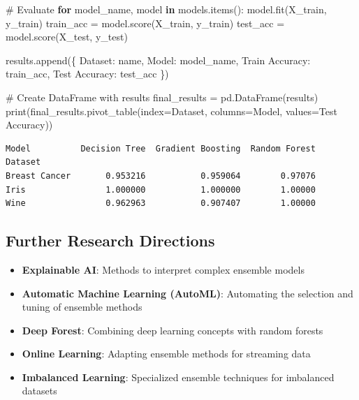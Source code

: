 \documentclass[
  letterpaper,
  DIV=11,
  numbers=noendperiod]{scrreprt}
\newenvironment{Shaded}{\begin{snugshade}}{\end{snugshade}}
\newcommand{\BuiltInTok}[1]{\textcolor[rgb]{0.00,0.23,0.31}{#1}}
\newcommand{\CommentTok}[1]{\textcolor[rgb]{0.37,0.37,0.37}{#1}}
\newcommand{\ControlFlowTok}[1]{\textcolor[rgb]{0.00,0.23,0.31}{\textbf{#1}}}
\newcommand{\KeywordTok}[1]{\textcolor[rgb]{0.00,0.23,0.31}{\textbf{#1}}}
\newcommand{\NormalTok}[1]{\textcolor[rgb]{0.00,0.23,0.31}{#1}}
\newcommand{\OperatorTok}[1]{\textcolor[rgb]{0.37,0.37,0.37}{#1}}
\newcommand{\StringTok}[1]{\textcolor[rgb]{0.13,0.47,0.30}{#1}}
\providecommand{\tightlist}{%
  \setlength{\itemsep}{0pt}\setlength{\parskip}{0pt}}\usepackage{longtable,booktabs,array}
\begin{document}
\begin{Shaded}
\begin{Highlighting}[]
    \CommentTok{\# Evaluate}
    \ControlFlowTok{for}\NormalTok{ model\_name, model }\KeywordTok{in}\NormalTok{ models.items():}
\NormalTok{        model.fit(X\_train, y\_train)}
\NormalTok{        train\_acc }\OperatorTok{=}\NormalTok{ model.score(X\_train, y\_train)}
\NormalTok{        test\_acc }\OperatorTok{=}\NormalTok{ model.score(X\_test, y\_test)}
        
\NormalTok{        results.append(\{}
            \StringTok{\textquotesingle{}Dataset\textquotesingle{}}\NormalTok{: name,}
            \StringTok{\textquotesingle{}Model\textquotesingle{}}\NormalTok{: model\_name,}
            \StringTok{\textquotesingle{}Train Accuracy\textquotesingle{}}\NormalTok{: train\_acc,}
            \StringTok{\textquotesingle{}Test Accuracy\textquotesingle{}}\NormalTok{: test\_acc}
\NormalTok{        \})}

\CommentTok{\# Create DataFrame with results}
\NormalTok{final\_results }\OperatorTok{=}\NormalTok{ pd.DataFrame(results)}
\BuiltInTok{print}\NormalTok{(final\_results.pivot\_table(index}\OperatorTok{=}\StringTok{\textquotesingle{}Dataset\textquotesingle{}}\NormalTok{, columns}\OperatorTok{=}\StringTok{\textquotesingle{}Model\textquotesingle{}}\NormalTok{, values}\OperatorTok{=}\StringTok{\textquotesingle{}Test Accuracy\textquotesingle{}}\NormalTok{))}
\end{Highlighting}
\end{Shaded}

\begin{verbatim}
Model          Decision Tree  Gradient Boosting  Random Forest
Dataset                                                       
Breast Cancer       0.953216           0.959064        0.97076
Iris                1.000000           1.000000        1.00000
Wine                0.962963           0.907407        1.00000
\end{verbatim}

\subsection{Further Research
Directions}\label{further-research-directions}

\begin{itemize}
\tightlist
\item
  \textbf{Explainable AI}: Methods to interpret complex ensemble models
\item
  \textbf{Automatic Machine Learning (AutoML)}: Automating the selection
  and tuning of ensemble methods
\item
  \textbf{Deep Forest}: Combining deep learning concepts with random
  forests
\item
  \textbf{Online Learning}: Adapting ensemble methods for streaming data
\item
  \textbf{Imbalanced Learning}: Specialized ensemble techniques for
  imbalanced datasets
\end{itemize}
\end{document}
